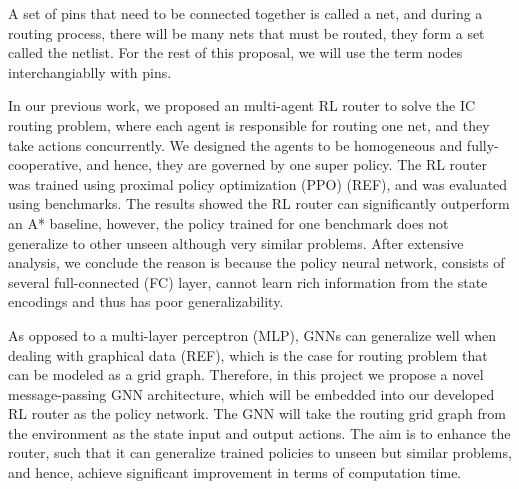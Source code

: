 \documentclass[letterpaper]{article}
\begin{document}
A set of pins that need to be connected together is called a net, and during a routing process, there will be many nets that must be routed, they form a set called the netlist. For the rest of this proposal, we will use the term nodes interchangiablly with pins.

In our previous work, we proposed an multi-agent RL router to solve the IC routing problem, where each agent is responsible for routing one net, and they take actions concurrently. We designed the agents to be homogeneous and fully-cooperative, and hence, they are governed by one super policy. The RL router was trained using proximal policy optimization (PPO) (REF), and was evaluated using benchmarks. The results showed the RL router can significantly outperform an A* baseline, however, the policy trained for one benchmark does not generalize to other unseen although very similar problems. After extensive analysis, we conclude the reason is because the policy neural network, consists of several full-connected (FC) layer, cannot learn rich information from the state encodings and thus has poor generalizability.

As opposed to a multi-layer perceptron (MLP), GNNs can generalize well when dealing with graphical data (REF), which is the case for routing problem that can be modeled as a grid graph. Therefore, in this project we propose a novel message-passing GNN architecture, which will be embedded into our developed RL router as the policy network. The GNN will take the routing grid graph from the environment as the state input and output actions. The aim is to enhance the router, such that it can generalize trained policies to unseen but similar problems, and hence, achieve significant improvement in terms of computation time.

 


\end{document}
